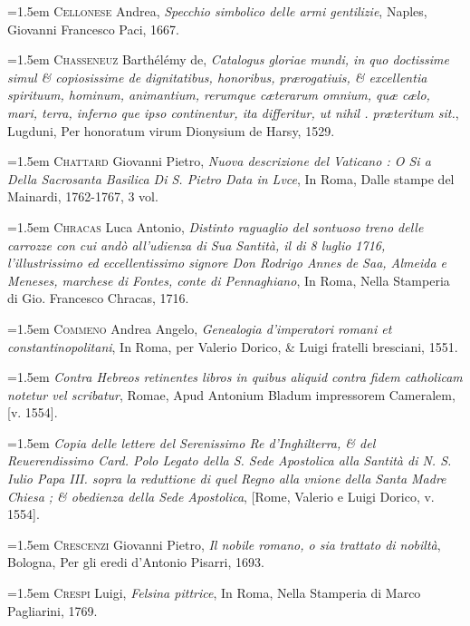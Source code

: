 \documentclass[12pt,twoside,openany]{book}
\newenvironment{PurhBibliography}
  {%
    \par
    \setlength{\parindent}{0pt}%
    \setlength{\leftskip}{0pt}%
  }
  {%
    \par
  }
\begin{document}
\begin{PurhBibliography}
\noindent\hangindent=1.5em \textsc{Cellonese} Andrea, \textit{Specchio simbolico delle armi gentilizie}, Naples, Giovanni Francesco Paci, 1667.\par
\noindent\hangindent=1.5em \textsc{Chasseneuz} Barthélémy de, \textit{Catalogus gloriae mundi, in quo doctissime simul \& copiosissime de dignitatibus, honoribus, prærogatiuis, \& excellentia spirituum, hominum, animantium, rerumque cæterarum omnium, quæ cælo, mari, terra, inferno que ipso continentur, ita differitur, ut nihil . præteritum sit.}, Lugduni, Per honoratum virum Dionysium de Harsy, 1529.\par
\noindent\hangindent=1.5em \textsc{Chattard} Giovanni Pietro, \textit{Nuova descrizione del Vaticano : O Si a Della Sacrosanta Basilica Di S. Pietro Data in Lvce}, In Roma, Dalle stampe del Mainardi, 1762-1767, 3 vol.\par
\noindent\hangindent=1.5em \textsc{Chracas} Luca Antonio, \textit{Distinto raguaglio del sontuoso treno delle carrozze con cui andò all’udienza di Sua Santità, il di 8 luglio 1716, l’illustrissimo ed eccellentissimo signore Don Rodrigo Annes de Saa, Almeida e Meneses, marchese di Fontes, conte di Pennaghiano}, In Roma, Nella Stamperia di Gio. Francesco Chracas, 1716.\par
\noindent\hangindent=1.5em \textsc{Commeno} Andrea Angelo, \textit{Genealogia d’imperatori romani et constantinopolitani}, In Roma, per Valerio Dorico, \& Luigi fratelli bresciani, 1551.\par
\noindent\hangindent=1.5em \textit{Contra Hebreos retinentes libros in quibus aliquid contra fidem catholicam notetur vel scribatur}, Romae, Apud Antonium Bladum impressorem Cameralem, [v. 1554].\par
\noindent\hangindent=1.5em \textit{Copia delle lettere del Serenissimo Re d’Inghilterra, \& del Reuerendissimo Card. Polo Legato della S. Sede Apostolica alla Santità di N. S. Iulio Papa III. sopra la reduttione di quel Regno alla vnione della Santa Madre Chiesa ; \& obedienza della Sede Apostolica}, [Rome, Valerio e Luigi Dorico, v. 1554].\par
\noindent\hangindent=1.5em \textsc{Crescenzi} Giovanni Pietro, \textit{Il nobile romano, o sia trattato di nobiltà}, Bologna, Per gli eredi d’Antonio Pisarri, 1693.\par
\noindent\hangindent=1.5em \textsc{Crespi} Luigi, \textit{Felsina pittrice}, In Roma, Nella Stamperia di Marco Pagliarini, 1769.\par

\end{PurhBibliography}
\end{document}
